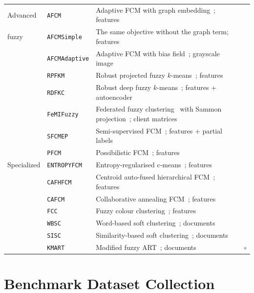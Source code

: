 \documentclass[twoside,11pt]{article}
\newcommand{\cmark}{\textcolor{green!70!black}{\ding{51}}}
\newcommand{\xmark}{\textcolor{red!75!black}{\ding{55}}}
\newcommand{\pmark}{\textcolor{orange!80!black}{$\circ$}}
\begin{document}
\begin{table}[ht]
\begin{tabular}{p{2.6cm} p{3.4cm} p{4.4cm} c}
\rowcolor{gray!10}
Advanced
& \texttt{AFCM} & Adaptive FCM with graph embedding~\cite{chen2024adaptive}; features & \cmark \\
\rowcolor{gray!10}
fuzzy
& \texttt{AFCMSimple} & The same objective without the graph term; features & \cmark \\
\rowcolor{gray!10}
& \texttt{AFCMAdaptive} & Adaptive FCM with bias field~\cite{pham1999adaptive}; grayscale image & \cmark \\
\rowcolor{gray!10}
& \texttt{RPFKM} & Robust projected fuzzy $k$-means~\cite{zhao2022improving}; features & \cmark \\
\rowcolor{gray!10}
& \texttt{RDFKC} & Robust deep fuzzy $k$-means~\cite{wu2024robust}; features + autoencoder & \cmark \\
\rowcolor{gray!10}
& \texttt{FeMIFuzzy} & Federated fuzzy clustering~\cite{ngo2023federated} with Sammon projection~\cite{sammon1969nonlinear}; client matrices & \cmark \\
\rowcolor{gray!10}
& \texttt{SFCMEP} & Semi-supervised FCM~\cite{xu2024semi}; features + partial labels & \cmark \\
\rowcolor{gray!10}
& \texttt{PFCM} & Possibilistic FCM~\cite{pal2005possibilistic}; features & \cmark \\

Specialized
& \texttt{ENTROPYFCM} & Entropy-regularised c-means~\cite{gupta2019fuzzy}; features & \cmark \\
& \texttt{CAFHFCM} & Centroid auto-fused hierarchical FCM~\cite{lin2020centroid}; features & \cmark \\
& \texttt{CAFCM} & Collaborative annealing FCM~\cite{li2023soft}; features & \cmark \\
& \texttt{FCC} & Fuzzy colour clustering~\cite{kim2024fuzzy}; features & \cmark \\
& \texttt{WBSC} & Word-based soft clustering~\cite{lin2001word}; documents & \xmark \\
& \texttt{SISC} & Similarity-based soft clustering~\cite{lin2001similarity}; documents & \xmark \\
& \texttt{KMART} & Modified fuzzy ART~\cite{kondadadi2002modified}; documents & \pmark \\

\bottomrule
\end{tabular}
\end{table}

\section{Benchmark Dataset Collection}
\label{app:dataset}
\end{document}
